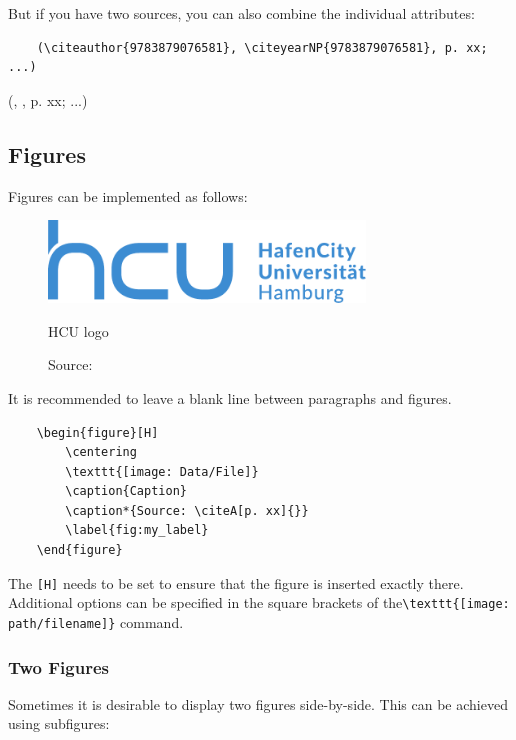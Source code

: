 But if you have two sources, you can also combine the individual attributes:

\begin{verbatim}
    (\citeauthor{9783879076581}, \citeyearNP{9783879076581}, p. xx; ...)
\end{verbatim}

(\citeauthor{9783879076581}, , p. xx; ...)


\subsection{Figures}

Figures can be implemented as follows:

\begin{figure}[H]
    \centering
    \includegraphics[width=0.75\textwidth]{Data/hcu_logo.pdf}
    \caption{HCU logo}
    \caption*{Source: } %
    \label{fig:HCU-logo}
\end{figure}

It is recommended to leave a blank line between paragraphs and figures.

\begin{verbatim}
    \begin{figure}[H]
        \centering
        \texttt{[image: Data/File]}
        \caption{Caption}
        \caption*{Source: \citeA[p. xx]{}}
        \label{fig:my_label}
    \end{figure}
\end{verbatim}

The \verb|[H]| needs to be set to ensure that the figure is inserted exactly there. Additional options can be specified in the square brackets of the\linebreak \verb|\texttt{[image: path/filename]}| command.


\subsubsection{Two Figures}

Sometimes it is desirable to display two figures side-by-side. This can be achieved using subfigures:

